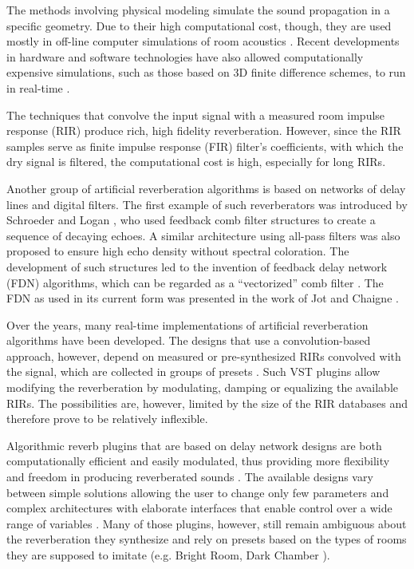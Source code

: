 \documentclass[twoside,a4paper]{article}
\begin{document}
The methods involving physical modeling simulate the sound propagation in a specific geometry. Due to their high computational cost, though, they are used mostly in off-line computer simulations of room acoustics \cite{peters2012}. 
Recent developments in hardware and software technologies have also allowed computationally expensive simulations, such as those based on 3D finite difference schemes, to run in real-time \cite{bilbao2019passive}.

The techniques that convolve the input signal with a measured room impulse response (RIR) produce rich, high fidelity reverberation. However, since the RIR samples serve as finite impulse response (FIR) filter's coefficients, with which the dry signal is filtered, the computational cost is high, especially for long RIRs. 

Another group of artificial reverberation algorithms is based on networks of delay lines and digital filters. The first example of such reverberators was introduced by Schroeder and Logan \cite{schroeder}, who used feedback comb filter structures to create a sequence of decaying echoes. A similar architecture using all-pass filters was also proposed to ensure high echo density without spectral coloration. The development of such structures led to the invention of feedback delay network (FDN) algorithms, which can be regarded as a ``vectorized'' comb filter \cite{Valimaki:2012}. The FDN as used in its current form was presented in the work of Jot and Chaigne \cite{Jot:Chaine:1991:aes, Jot:Chaine:1996}. 

Over the years, many real-time implementations of artificial reverberation algorithms have been developed. The designs that use a convolution-based approach, however, depend on measured or pre-synthesized RIRs convolved with the signal, which are collected in groups of presets \cite{peters2012, heise2009automatic, borss2009, ableton}. Such VST plugins allow modifying the reverberation by modulating, damping or equalizing the available RIRs. The possibilities are, however, limited by the size of the RIR databases and therefore prove to be relatively inflexible. 

Algorithmic reverb plugins that are based on delay network designs are both computationally efficient and easily modulated, thus providing more flexibility and freedom in producing reverberated sounds \cite{kereliuk2018, philbert2017developing}. The available designs vary between simple solutions allowing the user to change only few parameters \cite{moffat2019} and complex architectures with elaborate interfaces that enable control over a wide range of variables \cite{erbe2015}. Many of those plugins, however, still remain ambiguous about the reverberation they synthesize and rely on presets based on the types of rooms they are supposed to imitate (e.g. Bright Room, Dark Chamber \cite{valhalla}).
\end{document}
